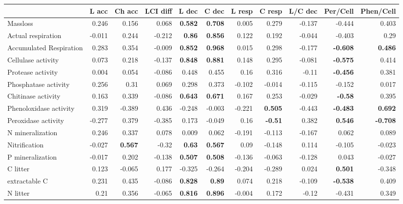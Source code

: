 \documentclass[10pt]{article}
\begin{document}
\begin{flushleft}
\begin{landscape}
\begin{table}[h!]
\begin{center}
\label{corrtable2}
{\small
\begin{tabular}{lrrrrrrrrrr}
  \hline
 & L acc & Ch acc & LCI diff & L dec & C dec & L resp & C resp & L/C dec & Per/Cell & Phen/Cell \\ 
  \hline
Massloss & 0.246 & 0.156 & 0.068 & \textbf{0.582} & \textbf{0.708} & 0.005 & 0.279 & -0.137 & -0.444 & 0.403 \\ 
  Actual respiration & -0.011 & 0.244 & -0.212 & \textbf{0.86} & \textbf{0.856} & 0.122 & 0.192 & -0.044 & -0.403 & 0.29 \\ 
  Accumulated Respiration & 0.283 & 0.354 & -0.009 & \textbf{0.852} & \textbf{0.968} & 0.015 & 0.298 & -0.177 & \textbf{-0.608} & \textbf{0.486} \\ 
  Cellulase activity & 0.073 & 0.218 & -0.137 & \textbf{0.848} & \textbf{0.881} & 0.148 & 0.295 & -0.081 & \textbf{-0.575} & 0.414 \\ 
  Protease activity & 0.004 & 0.054 & -0.086 & 0.448 & 0.455 & 0.16 & 0.316 & -0.11 & \textbf{-0.456} & 0.381 \\ 
  Phosphatase activity & 0.256 & 0.31 & 0.069 & 0.298 & 0.373 & -0.102 & -0.014 & -0.115 & -0.152 & 0.017 \\ 
  Chitinase activity & 0.163 & 0.339 & -0.086 & \textbf{0.643} & \textbf{0.671} & 0.167 & 0.253 & -0.029 & \textbf{-0.58} & 0.395 \\ 
  Phenoloxidase activity & 0.319 & -0.389 & 0.436 & -0.248 & -0.003 & -0.221 & \textbf{0.505} & -0.443 & \textbf{-0.483} & \textbf{0.692} \\ 
  Peroxidase activity & -0.277 & 0.379 & -0.385 & 0.173 & -0.049 & 0.16 & \textbf{-0.51} & 0.382 & \textbf{0.546} & \textbf{-0.708} \\ 
  N mineralization & 0.246 & 0.337 & 0.078 & 0.009 & 0.062 & -0.191 & -0.113 & -0.167 & 0.062 & 0.089 \\ 
  Nitrification & -0.027 & \textbf{0.567} & -0.32 & \textbf{0.63} & \textbf{0.567} & 0.09 & -0.148 & 0.114 & -0.105 & -0.023 \\ 
  P mineralization & -0.017 & 0.202 & -0.138 & \textbf{0.507} & \textbf{0.508} & -0.136 & -0.063 & -0.128 & 0.043 & -0.027 \\ 
  C litter & 0.123 & -0.065 & 0.177 & -0.325 & -0.264 & -0.204 & -0.289 & 0.024 & \textbf{0.501} & -0.348 \\ 
  extractable C & 0.231 & 0.435 & -0.086 & \textbf{0.828} & \textbf{0.89} & 0.074 & 0.218 & -0.109 & \textbf{-0.538} & 0.409 \\ 
  N litter & 0.21 & 0.356 & -0.065 & \textbf{0.816} & \textbf{0.896} & -0.004 & 0.172 & -0.12 & -0.431 & 0.349 \\ 

\end{tabular}}
\end{center}
\end{table}
\end{landscape}
\end{flushleft}
\end{document}
